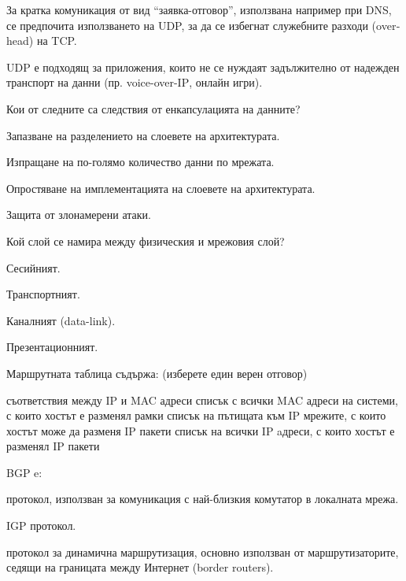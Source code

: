 \begin{questions}
\begin{choices}
    \CorrectChoice За кратка комуникация от вид "`заявка-отговор"', използвана
    например при DNS, се предпочита използването на UDP, за да се избегнат
    служебните разходи (\foreignlanguage{english}{overhead}) на TCP.

    \CorrectChoice UDP е подходящ за приложения, които не се нуждаят
    задължително от надежден транспорт на данни
    (пр. \foreignlanguage{english}{voice-over-IP}, онлайн игри).
  \end{choices}

  \question[6] Кои от следните са следствия от енкапсулацията на данните?
  \begin{choices}
    \CorrectChoice Запазване на разделението на слоевете на архитектурата.

    \choice Изпращане на по-голямо количество данни по мрежата.

    \CorrectChoice Опростяване на имплементацията на слоевете на архитектурата.

    \choice Защита от злонамерени атаки.
  \end{choices}

  \question[6] Кой слой се намира между физическия и мрежовия слой?
  \begin{oneparchoices}
    \choice Сесийният.

    \choice Транспортният.

    \CorrectChoice Каналният (\foreignlanguage{english}{data-link}).

    \choice Презентационният.
  \end{oneparchoices}

  \question[6] Маршрутната таблица съдържа: (изберете един верен отговор)
  \begin{choices}
    \choice съответствия между IP и MAC адреси
    \choice списък с всички MAC адреси на системи, с които хостът е разменял
    рамки
    \CorrectChoice списък на пътищата към IP мрежите, с които хостът може да
    разменя IP пакети
    \choice списък на всички IP aдреси, с които хостът е разменял IP пакети
  \end{choices}

  \question[6] BGP e:
  \begin{choices}
    \choice протокол, използван за комуникация с най-близкия комутатор в
    локалната мрежа.

    \choice IGP протокол.

    \CorrectChoice протокол за динамична маршрутизация, основно използван от
    маршрутизаторите, седящи на границата между Интернет
    (\foreignlanguage{english}{border routers}).


\end{choices}
\end{questions}

